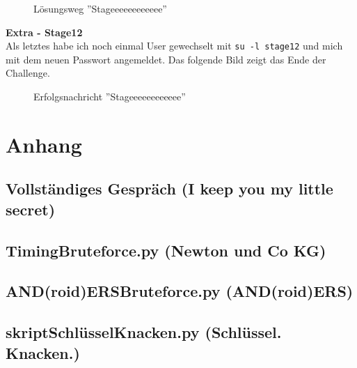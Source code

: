 \documentclass[12pt, a4paper, titlepage, oneside]{scrartcl}
\begin{document}
	\begin{figure}[h!]
		\centering
		\caption{Lösungsweg ''Stageeeeeeeeeeee''}
		\label{fig:stageeeeeeeeeeee_solution}
	\end{figure}
	\newpage

	{\large \textbf{Extra - Stage12}} \\ Als letztes habe ich noch einmal User
	gewechselt mit \lstinline{su -l stage12} und mich mit dem neuen Passwort angemeldet.
	Das folgende Bild zeigt das Ende der Challenge.

	\begin{figure}[h!]
		\centering
		\caption{Erfolgsnachricht ''Stageeeeeeeeeeee''}
		\label{fig:stage_end}
	\end{figure}
	\newpage

	\section{Anhang}

	\subsection{Vollständiges Gespräch (I keep you my little secret)}
	

	\subsection{TimingBruteforce.py (Newton und Co KG)}
	

    \subsection{AND(roid)ERSBruteforce.py (AND(roid)ERS)}
    

	\subsection{skriptSchlüsselKnacken.py (Schlüssel. Knacken.)}
	

\end{document}
